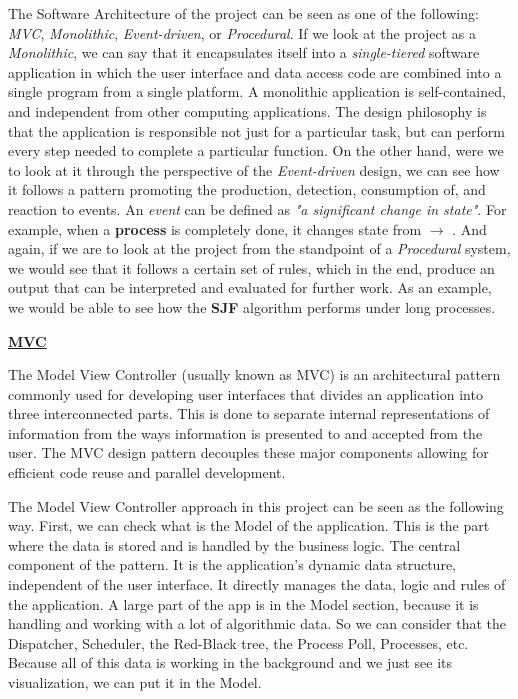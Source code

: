\documentclass{article}
\newcommand{\code}[1]{\codeinline{\texttt{#1}}}
\begin{document}
The Software Architecture of the project can be seen as one of the following: \textit{MVC}, \textit{Monolithic}, \textit{Event-driven}, or \textit{Procedural}. If we look at the project as a \textit{Monolithic}, we can say that it encapsulates itself into a \textit{single-tiered} software application in which the user interface and data access code are combined into a single program from a single platform. A monolithic application is self-contained, and independent from other computing applications. The design philosophy is that the application is responsible not just for a particular task, but can perform every step needed to complete a particular function. On the other hand, were we to look at it through the perspective of the \textit{Event-driven} design, we can see how it follows a pattern promoting the production, detection, consumption of, and reaction to events. An \textit{event} can be defined as \textit{"a significant change in state"}. For example, when a \textbf{process} \code{ttl} is completely done, it changes state from \code{RUNNING} $\rightarrow$ \code{DONE}. And again, if we are to look at the project from the standpoint of a \textit{Procedural} system, we would see that it follows a certain set of rules, which in the end, produce an output that can be interpreted and evaluated for further work. As an example, we would be able to see how the \textbf{SJF} algorithm performs under long processes.

\bigskip

\textbf{\underline{MVC}}

The Model View Controller (usually known as MVC) is an architectural pattern commonly used for developing user interfaces that divides an application into three interconnected parts. This is done to separate internal representations of information from the ways information is presented to and accepted from the user. The MVC design pattern decouples these major components allowing for efficient code reuse and parallel development.

The Model View Controller approach in this project can be seen as the following way. First, we can check what is the Model of the application. This is the part where the data is stored and is handled by the business logic. The central component of the pattern. It is the application's dynamic data structure, independent of the user interface. It directly manages the data, logic and rules of the application. A large part of the app is in the Model section, because it is handling and working with a lot of algorithmic data. So we can consider that the Dispatcher, Scheduler, the Red-Black tree, the Process Poll, Processes, etc. Because all of this data is working in the background and we just see its visualization, we can put it in the Model.
\end{document}
